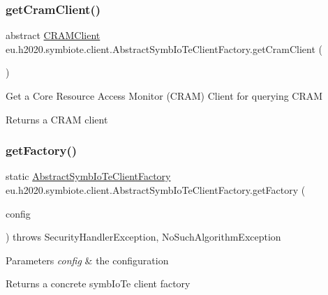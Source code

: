 \subsubsection{\texorpdfstring{get\+Cram\+Client()}{getCramClient()}}
{\footnotesize\ttfamily abstract \hyperlink{interfaceeu_1_1h2020_1_1symbiote_1_1client_1_1interfaces_1_1CRAMClient}{C\+R\+A\+M\+Client} eu.\+h2020.\+symbiote.\+client.\+Abstract\+Symb\+Io\+Te\+Client\+Factory.\+get\+Cram\+Client (\begin{DoxyParamCaption}{ }\end{DoxyParamCaption})\hspace{0.3cm}{\ttfamily [abstract]}}

Get a Core Resource Access Monitor (C\+R\+AM) Client for querying C\+R\+AM

\begin{DoxyReturn}{Returns}
a C\+R\+AM client 
\end{DoxyReturn}
\mbox{\label{classeu_1_1h2020_1_1symbiote_1_1client_1_1AbstractSymbIoTeClientFactory_aa2bad8b989cec6b2b2d6f8c97432c116}} 
\subsubsection{\texorpdfstring{get\+Factory()}{getFactory()}}
{\footnotesize\ttfamily static \hyperlink{classeu_1_1h2020_1_1symbiote_1_1client_1_1AbstractSymbIoTeClientFactory}{Abstract\+Symb\+Io\+Te\+Client\+Factory} eu.\+h2020.\+symbiote.\+client.\+Abstract\+Symb\+Io\+Te\+Client\+Factory.\+get\+Factory (\begin{DoxyParamCaption}\item[{Config}]{config }\end{DoxyParamCaption}) throws Security\+Handler\+Exception, No\+Such\+Algorithm\+Exception\hspace{0.3cm}{\ttfamily [static]}}


\begin{DoxyParams}{Parameters}
{\em config} & the configuration \\
\hline
\end{DoxyParams}
\begin{DoxyReturn}{Returns}
a concrete symb\+Io\+Te client factory 
\end{DoxyReturn}

